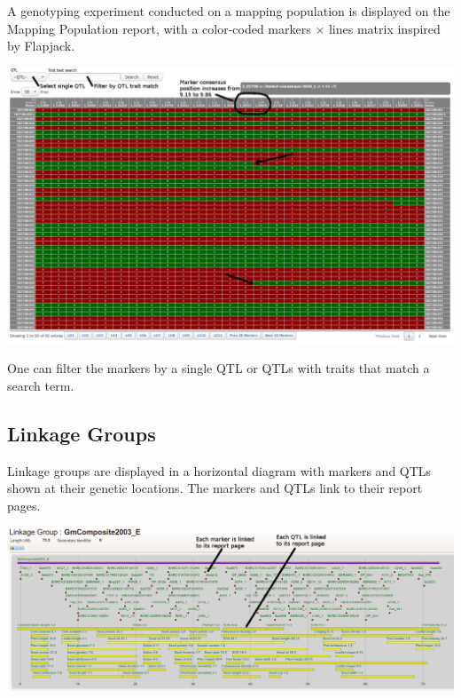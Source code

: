 \documentclass[]{pagposter}
\newlength{\figwidth}
\begin{document}
\begin{multicols*}{3}
  A genotyping experiment conducted on a mapping population is displayed on the Mapping Population report, with a color-coded markers $\times$ lines matrix inspired by Flapjack.

  \begin{center}
    \includegraphics[width=\figwidth]{genotype-matrix.png} %
  \end{center}

  One can filter the markers by a single QTL or QTLs with traits that match a search term.

  \subsection*{Linkage Groups}

  Linkage groups are displayed in a horizontal diagram with markers and QTLs shown at their genetic locations. The markers and QTLs link to their report pages.

  \begin{center}
    \includegraphics[width=\figwidth]{linkage-group-diagram.png} %
  \end{center}
  

\end{multicols*}
\end{document}
